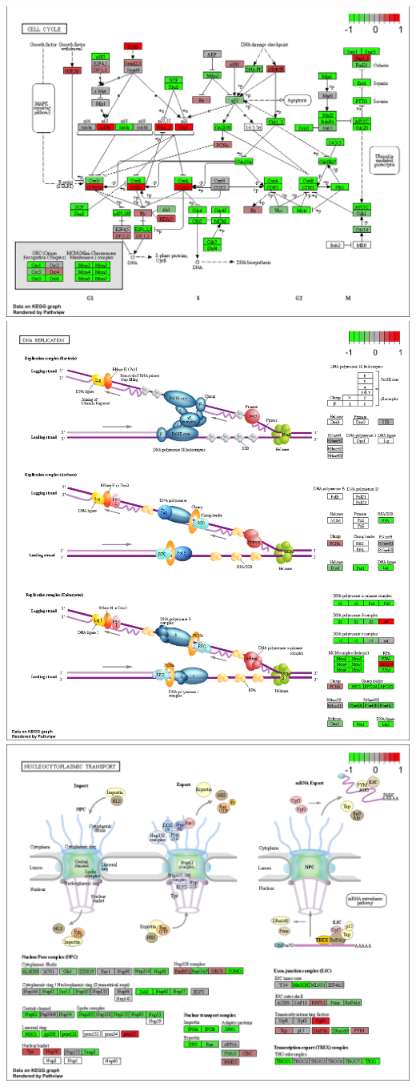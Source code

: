\documentclass[
  letterpaper,
  DIV=11,
  numbers=noendperiod]{scrartcl}
\begin{document}
\includegraphics{hsa04110.pathview.png}
\includegraphics{hsa03030.pathview.png}
\includegraphics{hsa03013.pathview.png}
\end{document}
